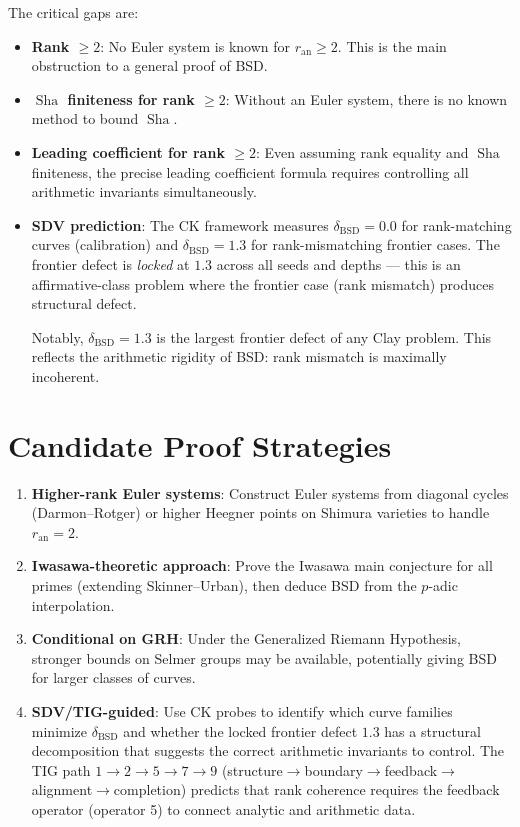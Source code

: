 \documentclass[11pt]{article}
\theoremstyle{definition}
\DeclareMathOperator{\Sha}{Sha}
\begin{document}
The critical gaps are:
\begin{itemize}
  \item \textbf{Rank $\geq 2$}: No Euler system is known for $r_{\mathrm{an}} \geq 2$.
    This is the main obstruction to a general proof of BSD.
  \item \textbf{$\Sha$ finiteness for rank $\geq 2$}: Without an Euler system,
    there is no known method to bound $\Sha$.
  \item \textbf{Leading coefficient for rank $\geq 2$}: Even assuming rank equality
    and $\Sha$ finiteness, the precise leading coefficient formula requires
    controlling all arithmetic invariants simultaneously.
  \item \textbf{SDV prediction}: The CK framework measures $\delta_{\mathrm{BSD}} = 0.0$
    for rank-matching curves (calibration) and $\delta_{\mathrm{BSD}} = 1.3$
    for rank-mismatching frontier cases.  The frontier defect is \emph{locked} at $1.3$
    across all seeds and depths --- this is an affirmative-class problem where the
    frontier case (rank mismatch) produces structural defect.

    Notably, $\delta_{\mathrm{BSD}} = 1.3$ is the largest frontier defect of any Clay problem.
    This reflects the arithmetic rigidity of BSD: rank mismatch is maximally incoherent.
\end{itemize}

\section{Candidate Proof Strategies}

\begin{enumerate}
  \item \textbf{Higher-rank Euler systems}: Construct Euler systems from
    diagonal cycles (Darmon--Rotger) or higher Heegner points on Shimura varieties
    to handle $r_{\mathrm{an}} = 2$.

  \item \textbf{Iwasawa-theoretic approach}: Prove the Iwasawa main conjecture
    for all primes (extending Skinner--Urban), then deduce BSD from the
    $p$-adic interpolation.

  \item \textbf{Conditional on GRH}: Under the Generalized Riemann Hypothesis,
    stronger bounds on Selmer groups may be available, potentially giving
    BSD for larger classes of curves.

  \item \textbf{SDV/TIG-guided}: Use CK probes to identify which curve families
    minimize $\delta_{\mathrm{BSD}}$ and whether the locked frontier defect $1.3$
    has a structural decomposition that suggests the correct arithmetic invariants
    to control.  The TIG path $1 \to 2 \to 5 \to 7 \to 9$
    (structure$\to$boundary$\to$feedback$\to$alignment$\to$completion)
    predicts that rank coherence requires the feedback operator (operator 5)
    to connect analytic and arithmetic data.
\end{enumerate}
\end{document}
